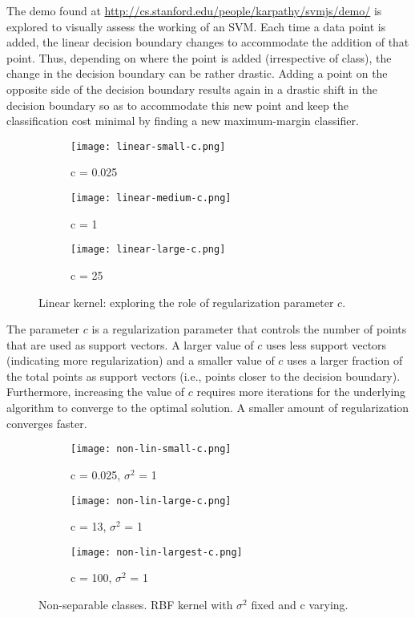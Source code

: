 \documentclass[paper=a4, fontsize=11pt]{scrartcl} %
\numberwithin{equation}{section} %
\begin{document}
The demo found at \url{http://cs.stanford.edu/people/karpathy/svmjs/demo/} is explored to visually assess the working of an SVM. Each time a data point is added, the linear decision boundary changes to accommodate the addition of that point. Thus, depending on where the point is added (irrespective of class), the change in the decision boundary can be rather drastic. Adding a point on the opposite side of the decision boundary results again in a drastic shift in the decision boundary so as to accommodate this new point and keep the classification cost minimal by finding a new maximum-margin classifier.\\

\begin{figure}[ht]
\centering
	\begin{subfigure}[b]{0.3\textwidth}
		\centering
		\texttt{[image: linear-small-c.png]}
		\caption{c = 0.025}
	\end{subfigure}
	\begin{subfigure}[b]{0.3\textwidth}
		\centering
		\texttt{[image: linear-medium-c.png]}
		\caption{c = 1}
	\end{subfigure}
	\begin{subfigure}[b]{0.3\textwidth}
		\centering
		\texttt{[image: linear-large-c.png]}
		\caption{c = 25}
	\end{subfigure}
\caption{Linear kernel: exploring the role of regularization parameter $c$.}
\label{linear}
\end{figure} 

The parameter $c$ is a regularization parameter that controls the number of points that are used as support vectors. A larger value of $c$ uses less support vectors (indicating more regularization) and a smaller value of $c$ uses a larger fraction of the total points as support vectors (i.e., points closer to the decision boundary). Furthermore, increasing the value of $c$ requires more iterations for the underlying algorithm to converge to the optimal solution. A smaller amount of regularization converges faster.\\

\begin{figure}[ht]
\centering
\begin{subfigure}[b]{0.3\textwidth}
		\centering
		\texttt{[image: non-lin-small-c.png]}
		\caption{c = 0.025, $\sigma^2$ = 1}
	\end{subfigure}
	\begin{subfigure}[b]{0.3\textwidth}
		\centering
		\texttt{[image: non-lin-large-c.png]}
		\caption{c = 13, $\sigma^2$ = 1}
	\end{subfigure}
	\begin{subfigure}[b]{0.3\textwidth}
		\centering
		\texttt{[image: non-lin-largest-c.png]}
		\caption{c = 100, $\sigma^2$ = 1}
	\end{subfigure}
\caption{Non-separable classes. RBF kernel with $\sigma^2$ fixed and c varying.}
\label{non-sep-fixed-sigma}
\end{figure}
\end{document}
